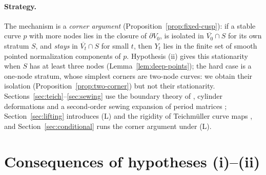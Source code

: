 \documentclass[12pt]{article}
\newcommand{\cl}[1]{\overline{#1}}
\theoremstyle{remark}
\begin{document}
\paragraph{Strategy.}
The mechanism is a \emph{corner argument}
(Proposition~\ref{prop:fixed-cusp}): if a stable curve \(p\) with
more nodes lies in the closure of \(\partial V_0\), is isolated in
\(\cl{V_0}\cap S\) for its own stratum \(S\), and \emph{stays} in
\(\cl{V_t}\cap S\) for small \(t\), then \(Y_t\) lies in the finite
set of smooth pointed normalization components of \(p\).
Hypothesis (ii) gives this stationarity when \(S\) has at
least three nodes (Lemma~\ref{lem:deep-points}); the hard case is a
one-node stratum, whose simplest corners are two-node curves: we
obtain their isolation (Proposition~\ref{prop:two-corner}) but not
their stationarity. Sections~\ref{sec:teich}--\ref{sec:sewing} use the
boundary theory of \cite{AHW}, cylinder deformations
\cite{WrightCylinder} and a second-order sewing expansion of period
matrices \cite{HuNorton}; Section~\ref{sec:lifting} introduces (L)
and the rigidity of Teichm\"uller curve maps \cite{McMullen}, and
Section~\ref{sec:conditional} runs the corner argument under (L).

\section{Consequences of hypotheses (i)--(ii)}\label{sec:hyp}
\end{document}
